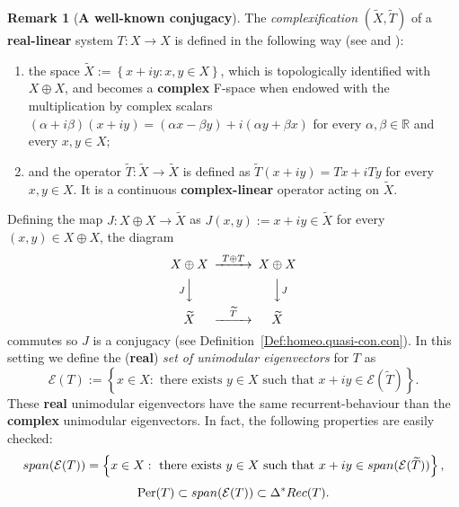 \documentclass[openright,11pt]{article}
\theoremstyle{plain}
\theoremstyle{definition}
\newtheorem{remark}[theorem]{Remark}
\newcommand{\RR}{\mathbb{R}}
\newcommand{\Del}{\Delta}
\newcommand{\Ec}{\mathcal{E}}
\newcommand{\Per}{\operatorname{Per}}
\newcommand{\Rec}{\textup{Rec}}
\newcommand{\lspan}{\textup{span}}
\newcommand{\til}{\widetilde} %
\begin{document}
\begin{remark}[\textbf{A well-known conjugacy}]\label{Rem:complexification}
	The {\em complexification} $(\til{X},\til{T})$ of a \textbf{real-linear} system $T:X\longrightarrow X$ is defined in the following way (see \cite{MuSaTo1999,MoMuPeSe2022} and \cite[Exercise 2.2.7]{GrPe2011_book}):
	\begin{enumerate}[--]
		\item the space $\til{X} := \left\{ x + iy : x,y \in X \right\}$, which is topologically identified with $X\oplus X$, and becomes a \textbf{complex} F-space when endowed with the multiplication by complex scalars $(\alpha+i\beta)(x+iy) = (\alpha x - \beta y) + i(\alpha y + \beta x)$ for every $\alpha,\beta \in \RR$ and every $x,y \in X$;
		
		\item and the operator $\til{T}:\til{X}\longrightarrow\til{X}$ is defined as $\til{T}(x+iy) = Tx + iTy$ for every $x,y \in X$. It is a continuous \textbf{complex-linear} operator acting on $\til{X}$.
	\end{enumerate}
	Defining the map $J:X\oplus X\longrightarrow\til{X}$ as $J(x,y):=x+iy \in \til{X}$ for every $(x,y) \in X\oplus X$, the diagram
	\begin{equation*}
		\begin{CD}
			X\oplus X  @>{T\oplus T}>> X\oplus X \\
			@V{J}VV  @VV{J}V \\
			\til{X}  @>{\til{T}}>>  \til{X} \\
		\end{CD}
	\end{equation*}
	commutes so $J$ is a conjugacy (see Definition~\ref{Def:homeo.quasi-con.con}). In this setting we define the (\textbf{real}) {\em set of unimodular eigenvectors} for $T$ as
	\[
	\Ec(T) := \left\{ x \in X : \text{ there exists } y \in X \text{ such that } x+iy \in \Ec(\til{T}) \right\}.
	\]
	These \textbf{real} unimodular eigenvectors have the same recurrent-behaviour than the \textbf{complex} unimodular eigenvectors. In fact, the following properties are easily checked:
	\[
	\lspan(\Ec(T)) = \left\{ x \in X : \text{ there exists } y \in X \text{ such that } x+iy \in \lspan(\Ec(\til{T})) \right\},
	\]
	\[
	\Per(T) \subset \lspan(\Ec(T)) \subset \Del^*\Rec(T).
	\]
\end{remark}
\end{document}
